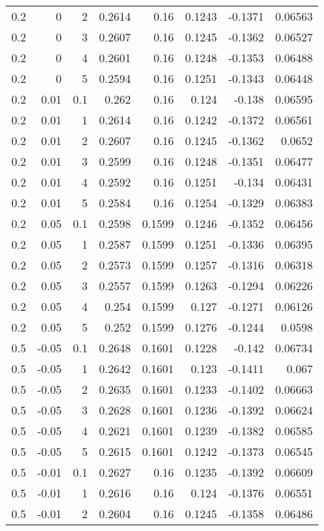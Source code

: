 \documentclass{amsart}
\theoremstyle{plain}
\numberwithin{equation}{section}
\begin{document}
\begin{longtable}{r | r | r | r | r | r | r | r}
0.2 & 0 & 2 & 0.2614 & 0.16 & 0.1243 & -0.1371 & 0.06563 \\
0.2 & 0 & 3 & 0.2607 & 0.16 & 0.1245 & -0.1362 & 0.06527 \\
0.2 & 0 & 4 & 0.2601 & 0.16 & 0.1248 & -0.1353 & 0.06488 \\
0.2 & 0 & 5 & 0.2594 & 0.16 & 0.1251 & -0.1343 & 0.06448 \\ \hline
0.2 & 0.01 & 0.1 & 0.262 & 0.16 & 0.124 & -0.138 & 0.06595 \\
0.2 & 0.01 & 1 & 0.2614 & 0.16 & 0.1242 & -0.1372 & 0.06561 \\
0.2 & 0.01 & 2 & 0.2607 & 0.16 & 0.1245 & -0.1362 & 0.0652 \\
0.2 & 0.01 & 3 & 0.2599 & 0.16 & 0.1248 & -0.1351 & 0.06477 \\
0.2 & 0.01 & 4 & 0.2592 & 0.16 & 0.1251 & -0.134 & 0.06431 \\
0.2 & 0.01 & 5 & 0.2584 & 0.16 & 0.1254 & -0.1329 & 0.06383 \\ \hline
0.2 & 0.05 & 0.1 & 0.2598 & 0.1599 & 0.1246 & -0.1352 & 0.06456 \\
0.2 & 0.05 & 1 & 0.2587 & 0.1599 & 0.1251 & -0.1336 & 0.06395 \\
0.2 & 0.05 & 2 & 0.2573 & 0.1599 & 0.1257 & -0.1316 & 0.06318 \\
0.2 & 0.05 & 3 & 0.2557 & 0.1599 & 0.1263 & -0.1294 & 0.06226 \\
0.2 & 0.05 & 4 & 0.254 & 0.1599 & 0.127 & -0.1271 & 0.06126 \\
0.2 & 0.05 & 5 & 0.252 & 0.1599 & 0.1276 & -0.1244 & 0.0598 \\ \hline
0.5 & -0.05 & 0.1 & 0.2648 & 0.1601 & 0.1228 & -0.142 & 0.06734 \\
0.5 & -0.05 & 1 & 0.2642 & 0.1601 & 0.123 & -0.1411 & 0.067 \\
0.5 & -0.05 & 2 & 0.2635 & 0.1601 & 0.1233 & -0.1402 & 0.06663 \\
0.5 & -0.05 & 3 & 0.2628 & 0.1601 & 0.1236 & -0.1392 & 0.06624 \\
0.5 & -0.05 & 4 & 0.2621 & 0.1601 & 0.1239 & -0.1382 & 0.06585 \\
0.5 & -0.05 & 5 & 0.2615 & 0.1601 & 0.1242 & -0.1373 & 0.06545 \\ \hline
0.5 & -0.01 & 0.1 & 0.2627 & 0.16 & 0.1235 & -0.1392 & 0.06609 \\
0.5 & -0.01 & 1 & 0.2616 & 0.16 & 0.124 & -0.1376 & 0.06551 \\
0.5 & -0.01 & 2 & 0.2604 & 0.16 & 0.1245 & -0.1358 & 0.06486 \\

\end{longtable}
\end{document}
